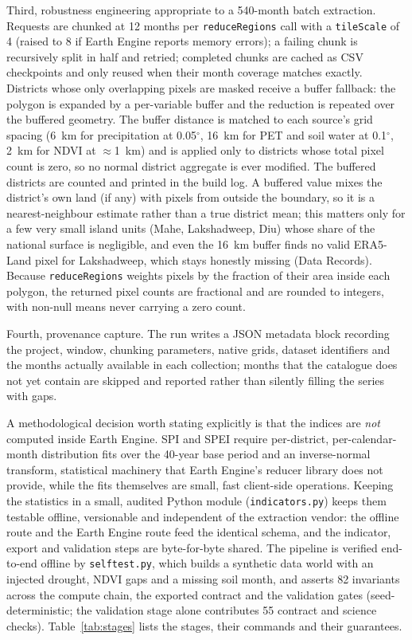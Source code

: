 \documentclass[10pt,a4paper]{article}
\begin{document}
Third, robustness engineering appropriate to a 540-month batch extraction. Requests are chunked at 12 months per \texttt{reduceRegions} call with a \texttt{tileScale} of 4 (raised to 8 if Earth Engine reports memory errors); a failing chunk is recursively split in half and retried; completed chunks are cached as CSV checkpoints and only reused when their month coverage matches exactly. Districts whose only overlapping pixels are masked receive a buffer fallback: the polygon is expanded by a per-variable buffer and the reduction is repeated over the buffered geometry. The buffer distance is matched to each source's grid spacing (6~km for precipitation at 0.05$^\circ$, 16~km for PET and soil water at 0.1$^\circ$, 2~km for NDVI at $\approx$1~km) and is applied only to districts whose total pixel count is zero, so no normal district aggregate is ever modified. The buffered districts are counted and printed in the build log. A buffered value mixes the district's own land (if any) with pixels from outside the boundary, so it is a nearest-neighbour estimate rather than a true district mean; this matters only for a few very small island units (Mahe, Lakshadweep, Diu) whose share of the national surface is negligible, and even the 16~km buffer finds no valid ERA5-Land pixel for Lakshadweep, which stays honestly missing (Data Records). Because \texttt{reduceRegions} weights pixels by the fraction of their area inside each polygon, the returned pixel counts are fractional and are rounded to integers, with non-null means never carrying a zero count.

Fourth, provenance capture. The run writes a JSON metadata block recording the project, window, chunking parameters, native grids, dataset identifiers and the months actually available in each collection; months that the catalogue does not yet contain are skipped and reported rather than silently filling the series with gaps.

A methodological decision worth stating explicitly is that the indices are \emph{not} computed inside Earth Engine. SPI and SPEI require per-district, per-calendar-month distribution fits over the 40-year base period and an inverse-normal transform, statistical machinery that Earth Engine's reducer library does not provide, while the fits themselves are small, fast client-side operations. Keeping the statistics in a small, audited Python module (\texttt{indicators.py}) keeps them testable offline, versionable and independent of the extraction vendor: the offline route and the Earth Engine route feed the identical schema, and the indicator, export and validation steps are byte-for-byte shared. The pipeline is verified end-to-end offline by \texttt{selftest.py}, which builds a synthetic data world with an injected drought, NDVI gaps and a missing soil month, and asserts 82 invariants across the compute chain, the exported contract and the validation gates (seed-deterministic; the validation stage alone contributes 55 contract and science checks). Table~\ref{tab:stages} lists the stages, their commands and their guarantees.
\end{document}
